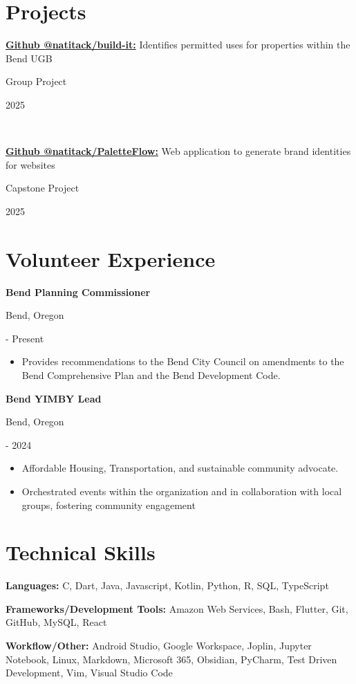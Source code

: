 \documentclass[10pt]{article}
\newcommand{\triline}[3]{%
    \parbox[t][][t]{.4\linewidth}{ #1 }%
    \parbox[t][][t]{.4\linewidth}{ #2 }%
    \parbox[t][][t]{.2\linewidth}{\raggedleft #3 }%
    \vspace{1ex}
}
\newcommand{\publication}[3]{%
    \parbox[t][][t]{.8\linewidth}{ #1 }%
    \parbox[t][][t]{.05\linewidth}{ #2 }%
    \parbox[t][][t]{.15\linewidth}{\raggedright #3 }%
    \vspace{0.5ex}
}
\newlength{\listpostvertical}
\begin{document}
\section{Projects}

\publication%
    {
    \textbf{ 
    \href{https://github.com/natitack/build-it}%
          {Github @natitack/build-it:}} Identifies permitted uses for properties within the Bend UGB}%

    {Group Project}%
    {2025}
    \\
\publication%
    {
    \textbf{ 
    \href{https://github.com/natitack/PaletteFlow}%
          {Github @natitack/PaletteFlow:}} Web application to generate brand identities for websites}%

    {Capstone Project}%
    {2025}

\section{Volunteer Experience}

    \triline{\textbf{Bend Planning Commissioner}}{Bend, Oregon}{ 2024 - Present}
    \vspace{\listpostvertical}
    
    \begin{itemize}[nosep]
    \item Provides recommendations to the Bend City Council on amendments to the Bend Comprehensive Plan and the Bend Development Code. 

    \end{itemize}

    \vspace{\listpostvertical}


    \triline{\textbf{Bend YIMBY Lead}}{Bend, Oregon}{2021 - 2024}
    \begin{itemize}[nosep]
    \item Affordable Housing, Transportation, and sustainable community advocate. 
    \item Orchestrated events within the organization and in collaboration with local groups, fostering community engagement
    
    \end{itemize}
    \vspace{\listpostvertical}
    


\section{Technical Skills}

\begin{trivlist}
    \item \textbf{Languages:}  C, Dart, Java, Javascript, Kotlin, Python, R, SQL, TypeScript
    \item \textbf{Frameworks/Development Tools:} Amazon Web Services, Bash, Flutter, Git, GitHub, MySQL, React
    \item \textbf{Workflow/Other:} Android Studio, Google Workspace, Joplin, Jupyter Notebook, Linux, Markdown, Microsoft 365, Obsidian, PyCharm, Test Driven Development, 
    Vim, Visual Studio Code
\end{trivlist}
\end{document}
